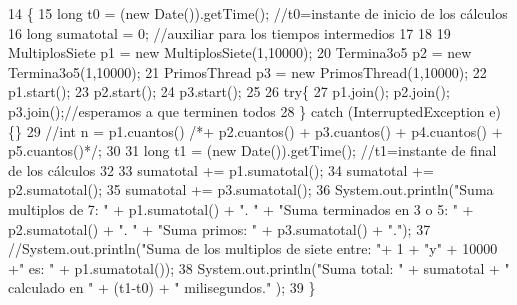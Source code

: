 \begin{DoxyCode}
14                                        \{
15            \textcolor{keywordtype}{long} t0 = (\textcolor{keyword}{new} Date()).getTime(); \textcolor{comment}{//t0=instante de inicio de los cálculos}
16            \textcolor{keywordtype}{long} sumatotal = 0; \textcolor{comment}{//auxiliar para los tiempos intermedios}
17            
18            
19            MultiplosSiete p1 = \textcolor{keyword}{new} MultiplosSiete(1,10000);
20            Termina3o5 p2 = \textcolor{keyword}{new} Termina3o5(1,10000);
21            PrimosThread p3 = \textcolor{keyword}{new} PrimosThread(1,10000);
22            p1.start();
23            p2.start();
24            p3.start();
25            
26            \textcolor{keywordflow}{try}\{
27             p1.join(); p2.join(); p3.join();\textcolor{comment}{//esperamos a que terminen todos}
28            \} \textcolor{keywordflow}{catch} (InterruptedException e)\{\}
29            \textcolor{comment}{//int n = p1.cuantos() /*+ p2.cuantos() + p3.cuantos() + p4.cuantos() + p5.cuantos()*/;}
30            
31            \textcolor{keywordtype}{long} t1 = (\textcolor{keyword}{new} Date()).getTime(); \textcolor{comment}{//t1=instante de final de los cálculos}
32            
33            sumatotal += p1.sumatotal();
34            sumatotal += p2.sumatotal();
35            sumatotal += p3.sumatotal();
36            System.out.println(\textcolor{stringliteral}{"Suma multiplos de 7: "} + p1.sumatotal() + \textcolor{stringliteral}{". "} + \textcolor{stringliteral}{"Suma terminados en 3 o 5: 
      "} + p2.sumatotal() + \textcolor{stringliteral}{". "} + \textcolor{stringliteral}{"Suma primos: "} + p3.sumatotal() + \textcolor{stringliteral}{"."});
37            \textcolor{comment}{//System.out.println("Suma de los multiplos de siete entre: "+ 1 + "y" + 10000 +" es: " +
       p1.sumatotal());}
38            System.out.println(\textcolor{stringliteral}{"Suma total: "} + sumatotal + \textcolor{stringliteral}{" calculado en "} + (t1-t0) + \textcolor{stringliteral}{" milisegundos."} );
39     \}
\end{DoxyCode}
